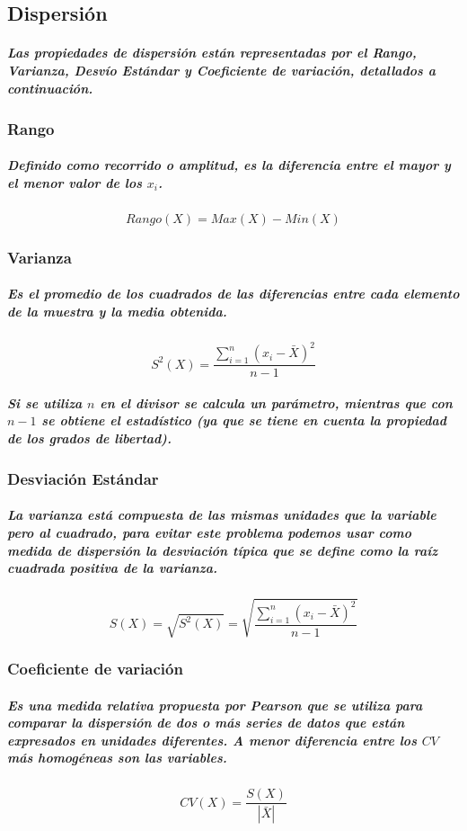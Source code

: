 \subsection{Dispersión}
\subparagraph{
Las propiedades de dispersión están representadas por el Rango, Varianza, Desvío Estándar y Coeficiente de variación, detallados a continuación.
}

\subsubsection{Rango}
\subparagraph{
Definido como recorrido o amplitud, es la diferencia entre el mayor y el menor valor de los $x_{i}$.
}
\begin{equation}
Rango(X)=Max(X)-Min(X)
\end{equation}

\subsubsection{Varianza}
\subparagraph{
Es el promedio de los cuadrados de las diferencias entre cada elemento de la muestra y la media obtenida.
}
\begin{equation}
S^2(X)=\frac{\displaystyle\sum_{i=1}^n (x_{i}-\bar{X})^2}{n-1}
\end{equation}
\subparagraph{
Si se utiliza $n$ en el divisor se calcula un parámetro, mientras que con $n-1$ se obtiene el estadístico (ya que se tiene en cuenta la propiedad de los grados de libertad).
}

\subsubsection{Desviación Estándar}
\subparagraph{
La varianza está compuesta de las mismas unidades que la variable pero al cuadrado, para evitar este problema podemos usar como medida de dispersión la desviación típica que se define como la raíz cuadrada positiva de la varianza.
}
\begin{equation}
S(X)=\sqrt{S^2(X)}=\sqrt{\frac{\displaystyle\sum_{i=1}^n (x_{i}-\bar{X})^2}{n-1}}
\end{equation}

\subsubsection{Coeficiente de variación}
\subparagraph{
Es una medida relativa propuesta por Pearson que se utiliza para comparar la dispersión de dos o más series de datos que están expresados en unidades diferentes. A menor diferencia entre los $CV$ más homogéneas son las variables.
}
\begin{equation}
CV(X)=\frac{S(X)}{|\bar{X}|}
\end{equation}


